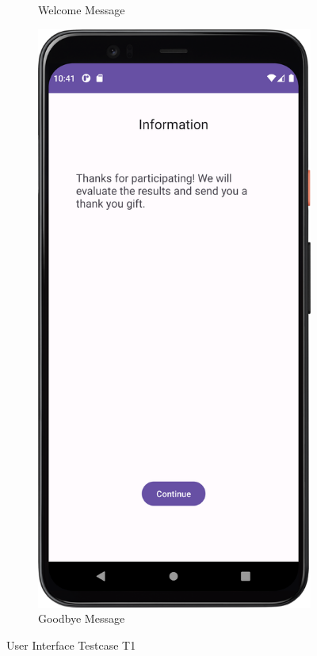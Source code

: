\begin{figure}[htbp]
\begin{subfigure}[b]{0.3\textwidth}
        \caption{Welcome Message}
        \label{subfig:welcomeMessage}
    \end{subfigure}
    \hspace{1cm}
    \begin{subfigure}[b]{0.3\textwidth}
        \centering
        \includegraphics[width=\textwidth]{content/07_evaluation_of_the_solution/Screenshot_GoodbyeMessage.png}
        \caption{Goodbye Message}
        \label{subfig:goodbyeMessage}
    \end{subfigure}
    \caption{User Interface Testcase T1}
    \label{fig:T1}
\end{figure}

